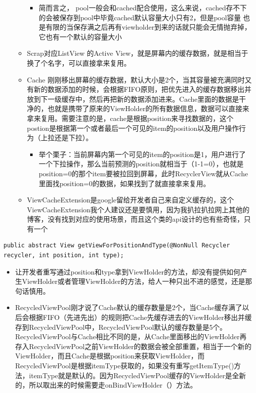 \documentclass[9pt, b5paper]{article}
\begin{document}
\begin{itemize}
\begin{itemize}
\begin{itemize}
\item 简而言之， pool一般会和cached配合使用，这么来说，cached存不下的会被保存到pool中毕竟cached默认容量大小只有2，但是pool容量 也是有限的当保存满之后再有viewholder到来的话就只能会无情抛弃掉，它也有一个默认的容量大小
\end{itemize}
\item Scrap对应ListView 的Active View，就是屏幕内的缓存数据，就是相当于换了个名字，可以直接拿来复用。
\item Cache 刚刚移出屏幕的缓存数据，默认大小是2个，当其容量被充满同时又有新的数据添加的时候，会根据FIFO原则，把优先进入的缓存数据移出并放到下一级缓存中，然后再把新的数据添加进来。Cache里面的数据是干净的，也就是携带了原来的ViewHolder的所有数据信息，数据可以直接来拿来复用。需要注意的是，cache是根据position来寻找数据的，这个postion是根据第一个或者最后一个可见的item的position以及用户操作行为（上拉还是下拉）。
\begin{itemize}
\item 举个栗子：当前屏幕内第一个可见的item的position是1，用户进行了一个下拉操作，那么当前预测的position就相当于（1-1=0），也就是position=0的那个item要被拉回到屏幕，此时RecyclerView就从Cache里面找position=0的数据，如果找到了就直接拿来复用。
\end{itemize}
\item ViewCacheExtension是google留给开发者自己来自定义缓存的，这个ViewCacheExtension我个人建议还是要慎用，因为我扒拉扒拉网上其他的博客，没有找到对应的使用场景，而且这个类的api设计的也有些奇怪，只有一个
\end{itemize}
\end{itemize}
\begin{verbatim}
public abstract View getViewForPositionAndType(@NonNull Recycler recycler, int position, int type);
\end{verbatim}
\begin{itemize}
\item 让开发者重写通过position和type拿到ViewHolder的方法，却没有提供如何产生ViewHolder或者管理ViewHolder的方法，给人一种只出不进的感觉，还是那句话慎用。
\item RecycledViewPool刚才说了Cache默认的缓存数量是2个，当Cache缓存满了以后会根据FIFO（先进先出）的规则把Cache先缓存进去的ViewHolder移出并缓存到RecycledViewPool中，RecycledViewPool默认的缓存数量是5个。RecycledViewPool与Cache相比不同的是，从Cache里面移出的ViewHolder再存入RecycledViewPool之前ViewHolder的数据会被全部重置，相当于一个新的ViewHolder，而且Cache是根据position来获取ViewHolder，而RecycledViewPool是根据itemType获取的，如果没有重写getItemType()方法，itemType就是默认的。因为RecycledViewPool缓存的ViewHolder是全新的，所以取出来的时候需要走onBindViewHolder（）方法。
\end{itemize}
\end{document}
